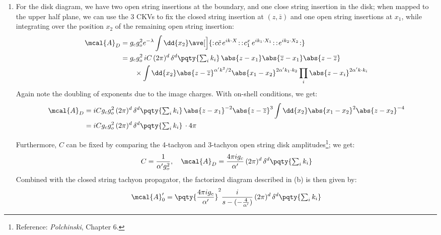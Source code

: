 \documentclass[a4paper,10pt]{article}
\begin{document}
\begin{enumerate}
\begin{enumerate}
	\item For the disk diagram, we have two open string insertions at the boundary, and one close string insertion in the disk; when mapped to the upper half plane, we can use the 3 CKVs to fix the closed string insertion at $(z,\bar{z})$ and one open string insertions at $x_1$, while integrating over the position $x_2$ of the remaining open string insertion:
	\begin{equation}
	\begin{aligned}
		\mcal{A}_D
		&= g_c g_o^2 e^{-\lambda}
			\int \dd{x_2}
			\ave[\Big]{
				\normorder{
					c\tilde{c}\,
					e^{ik\cdot X}
				}\,
				\normorder{
					c^x_1\,
					e^{ik_1\cdot X_1}
				}\,
				\normorder{
					e^{ik_2\cdot X_2}
				}
			} \\
		&= g_c g_o^2\, iC\,(2\pi)^d\,
			\delta^d\pqty{\textstyle\sum_i k_i}\,
				\abs{z - x_1}
				\abs{\bar{z} - x_1}
				\abs{z - \bar{z}}
		\\ & \hspace{2em} \times
			\int \dd{x_2}
				\abs{z - \bar{z}}^{\alpha'k^2/2}
				\abs{x_1 - x_2}^{2\alpha'k_1\cdot k_2}
			\prod_i
				\abs{z - x_i}^{2\alpha'k\cdot k_i} \\
	\end{aligned}
	\end{equation}
	Again note the doubling of exponents due to the image charges. With on-shell conditions, we get:
	\begin{equation}
	\begin{aligned}
		\mcal{A}_D
		&= iC g_c g_o^2\,
			(2\pi)^d\,
			\delta^d\pqty{\textstyle\sum_i k_i}\,
				\abs{z - x_1}^{-2}
				\abs{z - \bar{z}}^{3}
			\int \dd{x_2}
				\abs{x_1 - x_2}^{2}
				\abs{z - x_2}^{-4} \\
		&= iC g_c g_o^2\,
			(2\pi)^d\,
			\delta^d\pqty{\textstyle\sum_i k_i}\,
			\cdot 4\pi
	\end{aligned}
	\end{equation}
	
	Furthermore, $C$ can be fixed by comparing the 4-tachyon and 3-tachyon open string disk amplitudes\footnote{
		Reference: \textit{Polchinski}, Chapter 6. 
	}; we get:
	\begin{equation}
		C = \frac{1}{\alpha'g_o^2},\quad
		\mcal{A}_D
		= \frac{4\pi i g_c}{\alpha'}\,
			(2\pi)^d\,
			\delta^d\pqty{\textstyle\sum_i k_i}
	\end{equation}
	Combined with the closed string tachyon propagator, the factorized diagram described in (b) is then given by:
	\begin{equation}
		\mcal{A}'_0
		= \pqty{\frac{4\pi i g_c}{\alpha'}}^2
			\frac{i}{s - (-\frac{4}{\alpha'})}\,
			(2\pi)^d\,
			\delta^d\pqty{\textstyle\sum_i k_i}
	\end{equation}
	

\end{enumerate}
\end{enumerate}
\end{document}
